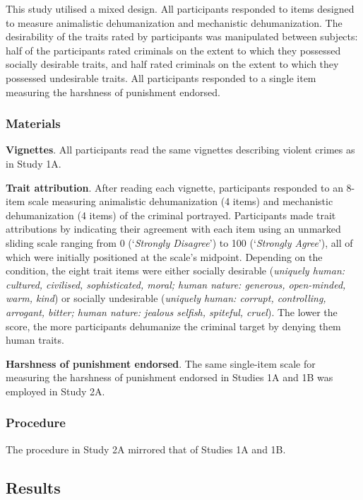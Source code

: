 \documentclass[
]{article}
\begin{document}
This study utilised a mixed design. All participants responded to items designed to measure animalistic dehumanization and mechanistic dehumanization. The desirability of the traits rated by participants was manipulated between subjects: half of the participants rated criminals on the extent to which they possessed socially desirable traits, and half rated criminals on the extent to which they possessed undesirable traits. All participants responded to a single item measuring the harshness of punishment endorsed.

\hypertarget{materials-2}{%
\subsubsection{Materials}\label{materials-2}}

\textbf{Vignettes}. All participants read the same vignettes describing violent crimes as in Study 1A.

\textbf{Trait attribution}. After reading each vignette, participants responded to an 8-item scale measuring animalistic dehumanization (4 items) and mechanistic dehumanization (4 items) of the criminal portrayed. Participants made trait attributions by indicating their agreement with each item using an unmarked sliding scale ranging from 0 (`\emph{Strongly Disagree}') to 100 (`\emph{Strongly Agree}'), all of which were initially positioned at the scale's midpoint. Depending on the condition, the eight trait items were either socially desirable (\emph{uniquely human: cultured, civilised, sophisticated, moral; human nature: generous, open-minded, warm, kind}) or socially undesirable (\emph{uniquely human: corrupt, controlling, arrogant, bitter; human nature: jealous selfish, spiteful, cruel}). The lower the score, the more participants dehumanize the criminal target by denying them human traits.

\textbf{Harshness of punishment endorsed}. The same single-item scale for measuring the harshness of punishment endorsed in Studies 1A and 1B was employed in Study 2A.

\hypertarget{procedure-1}{%
\subsubsection{Procedure}\label{procedure-1}}

The procedure in Study 2A mirrored that of Studies 1A and 1B.

\hypertarget{results-2}{%
\subsection{Results}\label{results-2}}
\end{document}
